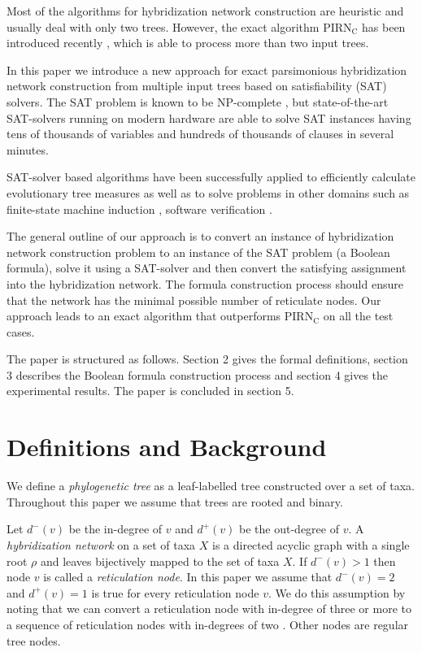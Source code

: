 \documentclass[runningheads, envcountsame, a4paper]{llncs}
\begin{document}
Most of the algorithms for hybridization network construction are heuristic \cite{wu2013algorithm, park2012murpar} 
and usually deal with only two trees.
However, the exact algorithm PIRN$_\mathrm{C}$ has been introduced recently \cite{wu2013algorithm}, which is able to process more than two input trees.

In this paper we introduce a new approach for exact parsimonious
hybridization network construction from multiple input trees based on satisfiability (SAT) solvers.
The SAT problem is known to be NP-complete \cite{bordewich2007computing}, but state-of-the-art SAT-solvers running on modern hardware 
are able to solve SAT instances having tens of thousands of variables and hundreds of thousands of clauses in several minutes.

SAT-solver based algorithms have been successfully applied to efficiently calculate evolutionary tree measures \cite{bonet2009efficiently}
as well as to solve problems in other domains such as
finite-state machine induction \cite{heule2010exact}, software verification \cite{biere2003bounded}.

The general outline of our approach is to convert an instance of hybridization network construction 
problem to an instance of the SAT problem (a Boolean formula), solve it using a SAT-solver and then convert 
the satisfying assignment into the hybridization network. The formula construction process should ensure that
the network has the minimal possible number of reticulate nodes. 
Our approach leads to an exact algorithm that outperforms PIRN$\mathrm{_C}$ on all the test cases.

The paper is structured as follows. Section 2 gives the formal definitions, section 3 describes the Boolean formula
construction process and section 4 gives the experimental results. The paper is concluded in section 5.

\section{Definitions and Background}

We define a \emph{phylogenetic tree} as a leaf-labelled tree constructed over a set of taxa. 
Throughout this paper we assume that trees are rooted and binary.

Let $d^-(v)$ be the in-degree of $v$ and $d^+(v)$ be the out-degree of $v$.
A \emph{hybridization network} on a set of taxa $X$ is a directed acyclic graph 
with a single root $\rho$ and leaves bijectively mapped to the set of taxa $X$. If $d^-(v) > 1$ then 
node $v$ is called a \emph{reticulation node}. In this paper we assume that $d^-(v) = 2$ and $d^+(v) = 1$ is true for every reticulation node $v$.
We do this assumption by noting that we can convert a reticulation node with in-degree 
of three or more to a sequence of reticulation nodes with in-degrees of two \cite{wu2010close}. Other nodes are regular 
tree nodes.
\end{document}
